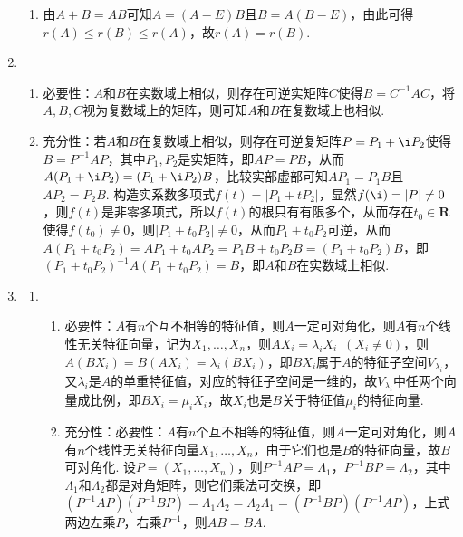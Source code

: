 \begin{enumerate}
\begin{enumerate}
              \item 由$A+B=AB$可知$A=(A-E)B$且$B=A(B-E)$，由此可得$r(A)\leqslant r(B)\leqslant r(A)$，故$r(A)=r(B)$.
          \end{enumerate}

    \item \begin{enumerate}
              \item 必要性：$A$和$B$在实数域上相似，则存在可逆实矩阵$C$使得$B=C^{-1}AC$，将$A,B,C$视为复数域上的矩阵，则可知$A$和$B$在复数域上也相似.

              \item 充分性：若$A$和$B$在复数域上相似，则存在可逆复矩阵$P=P_1+\i P_2$使得$B=P^{-1}AP$，其中$P_1,P_2$是实矩阵，即$AP=PB$，从而$A(P_1+\i P_2)=(P_1+\i P_2)B$，比较实部虚部可知$AP_1=P_1B$且$AP_2=P_2B$. 构造实系数多项式$f(t)=|P_1+tP_2|$，显然$f(\i)=|P|\neq 0$，则$f(t)$是非零多项式，所以$f(t)$的根只有有限多个，从而存在$t_0\in\mathbf{R}$使得$f(t_0)\neq 0$，则$|P_1+t_0P_2|\neq 0$，从而$P_1+t_0P_2$可逆，从而$A(P_1+t_0P_2)=AP_1+t_0AP_2=P_1B+t_0P_2B=(P_1+t_0P_2)B$，即$(P_1+t_0P_2)^{-1}A(P_1+t_0P_2)=B$，即$A$和$B$在实数域上相似.
          \end{enumerate}

    \item \label{ex:交换对角化}
          \begin{enumerate}
              \item \begin{enumerate}
                        \item 必要性：$A$有$n$个互不相等的特征值，则$A$一定可对角化，则$A$有$n$个线性无关特征向量，记为$X_1,\ldots,X_n$，则$AX_i=\lambda_iX_i\enspace (X_i\neq 0)$，则$A(BX_i)=B(AX_i)=\lambda_i(BX_i)$，即$BX_i$属于$A$的特征子空间$V_{\lambda_i}$，又$\lambda_i$是$A$的单重特征值，对应的特征子空间是一维的，故$V_{\lambda_i}$中任两个向量成比例，即$BX_i=\mu_iX_i$，故$X_i$也是$B$关于特征值$\mu_i$的特征向量.

                        \item 充分性：必要性：$A$有$n$个互不相等的特征值，则$A$一定可对角化，则$A$有$n$个线性无关特征向量$X_1,\ldots,X_n$，由于它们也是$B$的特征向量，故$B$可对角化. 设$P=(X_1,\ldots,X_n)$，则$P^{-1}AP=\varLambda_1$，$P^{-1}BP=\varLambda_2$，其中$\varLambda_1$和$\varLambda_2$都是对角矩阵，则它们乘法可交换，即$(P^{-1}AP)(P^{-1}BP)=\varLambda_1\varLambda_2=\varLambda_2\varLambda_1=(P^{-1}BP)(P^{-1}AP)$，上式两边左乘$P$，右乘$P^{-1}$，则$AB=BA$.
                    \end{enumerate}


\end{enumerate}
\end{enumerate}
